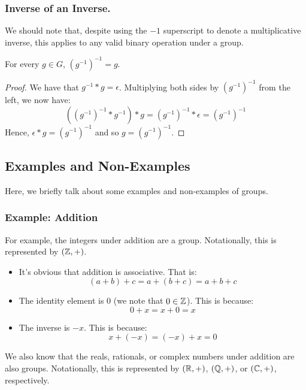 \documentclass[letterpaper]{article}
\begin{document}
\subsubsection{Inverse of an Inverse.}
We should note that, despite using the $-1$ superscript to denote a multiplicative inverse, this applies to any valid binary operation under a group. 

\begin{lemma}{}{}
    For every $g \in G$, $(g^{-1})^{-1} = g$. 
\end{lemma}

\begin{mdframed}
    \begin{proof}
        We have that $g^{-1} * g = \epsilon$. Multiplying both sides by $(g^{-1})^{-1}$ from the left, we now have: 
        \[((g^{-1})^{-1} * g^{-1}) * g = (g^{-1})^{-1} * \epsilon = (g^{-1})^{-1}\]
        Hence, $\epsilon * g = (g^{-1})^{-1}$ and so $g = (g^{-1})^{-1}$.     
    \end{proof}
\end{mdframed}

\subsection{Examples and Non-Examples}
Here, we briefly talk about some examples and non-examples of groups. 
\subsubsection{Example: Addition}
For example, the integers under addition are a group. Notationally, this is represented by $(\mathbb{Z}, +)$. 
\begin{itemize}
    \item It's obvious that addition is associative. That is:
    \[(a + b) + c = a + (b + c) = a + b + c\]

    \item The identity element is 0 (we note that $0 \in \mathbb{Z}$). This is because:
    \[0 + x = x + 0 = x\]

    \item The inverse is $-x$. This is because:
    \[x + (-x) = (-x) + x = 0\]
\end{itemize}
We also know that the reals, rationals, or complex numbers under addition are also groups. Notationally, this is represented by $(\mathbb{R}, +)$, $(\mathbb{Q}, +)$, or $(\mathbb{C}, +)$, respectively. 
\end{document}
